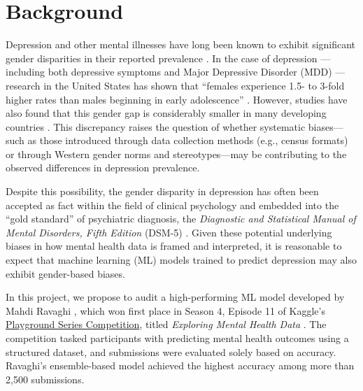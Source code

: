 \chapter{Background}
\hspace{3mm}

Depression and other mental illnesses have long been known to exhibit significant gender disparities in their reported prevalence \parencite{astbury1999gender}. In the case of depression — including both depressive symptoms and Major Depressive Disorder (MDD) — research in the United States has shown that “females experience 1.5- to 3-fold higher rates than males beginning in early adolescence” \parencite[p. 165]{APA2013DSM5}. However, studies have also found that this gender gap is considerably smaller in many developing countries \parencite{Sartorius1983}. This discrepancy raises the question of whether systematic biases—such as those introduced through data collection methods (e.g., census formats) or through Western gender norms and stereotypes—may be contributing to the observed differences in depression prevalence.

Despite this possibility, the gender disparity in depression has often been accepted as fact within the field of clinical psychology and embedded into the “gold standard” of psychiatric diagnosis, the \textit{Diagnostic and Statistical Manual of Mental Disorders, Fifth Edition} (DSM-5) \parencite{huntExploringGoldStandardEvidence2018}. Given these potential underlying biases in how mental health data is framed and interpreted, it is reasonable to expect that machine learning (ML) models trained to predict depression may also exhibit gender-based biases.

In this project, we propose to audit a high-performing ML model developed by Mahdi Ravaghi \parencite{ravaghiS04E11MentalHealth2024}, which won first place in Season 4, Episode 11 of Kaggle’s \href{https://www.kaggle.com/competitions/playground-series-s4e11}{Playground Series Competition}, titled \textit{Exploring Mental Health Data} \parencite{playground-series-s4e11}. The competition tasked participants with predicting mental health outcomes using a structured dataset, and submissions were evaluated solely based on accuracy. Ravaghi’s ensemble-based model achieved the highest accuracy among more than 2,500 submissions.

